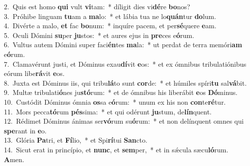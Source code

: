 {2.~}Quis est homo \textbf{qui} vult \textbf{vi}tam:~* díligit dies vi\textbf{dé}re \textbf{bo}nos?\\
{3.~}Próhibe linguam \textbf{tu}am a \textbf{ma}lo:~* et lábia tua ne lo\textbf{quán}tur \textbf{do}lum.\\
{4.~}Divérte a malo, \textbf{et} fac \textbf{bo}num:~* inquíre pacem, et per\textbf{sé}quere \textbf{e}am.\\
{5.~}Oculi Dómini \textbf{su}per \textbf{ju}stos:~* et aures ejus in \textbf{pre}ces e\textbf{ó}rum.\\
{6.~}Vultus autem Dómini super faci\textbf{én}tes \textbf{ma}la:~* ut perdat de terra memóri\textbf{am} e\textbf{ó}rum.\\
{7.~}Clamavérunt justi, et Dóminus exau\textbf{dí}vit \textbf{e}os:~* et ex ómnibus tribulatiónibus eórum libe\textbf{rá}vit \textbf{e}os.\\
{8.~}Juxta est Dóminus iis, qui tribu\textbf{lá}to sunt \textbf{cor}de:~* et húmiles spíri\textbf{tu} sal\textbf{vá}bit.\\
{9.~}Multæ tribulati\textbf{ó}nes ju\textbf{stó}rum:~* et de ómnibus his liberábit \textbf{e}os \textbf{Dó}minus.\\
{10.~}Custódit Dóminus ómnia \textbf{os}sa e\textbf{ó}rum:~* unum ex his non \textbf{con}te\textbf{ré}tur.\\
{11.~}Mors pecca\textbf{tó}rum \textbf{pés}sima:~* et qui odérunt \textbf{ju}stum, de\textbf{lín}quent.\\
{12.~}Rédimet Dóminus ánimas ser\textbf{vó}rum su\textbf{ó}rum:~* et non delínquent omnes qui \textbf{spe}rant in \textbf{e}o.\\
{13.~}Glória \textbf{Pa}tri, et \textbf{Fí}lio,~* et Spi\textbf{rí}tui \textbf{San}cto.\\
{14.~}Sicut erat in princípio, et \textbf{nunc}, et \textbf{sem}per,~* et in sǽcula sæcu\textbf{ló}rum. \textbf{A}men.\\
